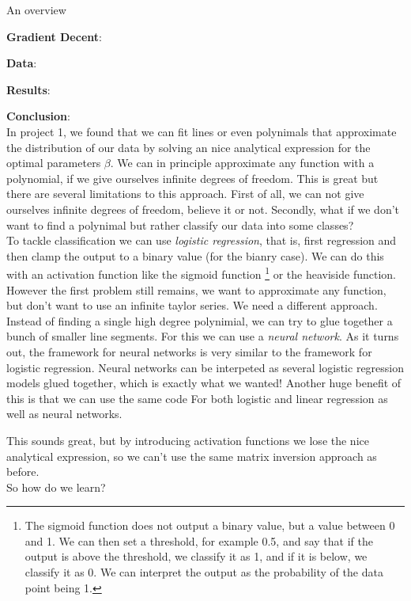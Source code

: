 \documentclass[twoside,11pt]{report}
\begin{document}
An overview

\textbf{Gradient Decent}: 

\textbf{Data}: 

\textbf{Results}:

\textbf{Conclusion}:\\

In project 1\cite{MachineLearningProjects_2023}, we found that 
we can fit lines or even polynimals that approximate the distribution of our data by solving an nice analytical expression for the optimal parameters $\beta$. We can in principle approximate 
any function with a polynomial, if we give ourselves infinite degrees of freedom. This is great but there are several
limitations to this approach. First of all, we can not give ourselves infinite degrees of freedom, believe it or not.
Secondly, what if we don't want to find a polynimal but rather classify our data into some classes?\\

To tackle classification we can use \emph{logistic regression}, that is, first regression and then clamp the output to a binary value
(for the bianry case). We can do this with an activation function like the sigmoid function
\footnote{The sigmoid function does not output a binary value, but a value between 0 and 1. 
    We can then set a threshold, for example 0.5, and say that if the output is above the threshold, 
    we classify it as 1, and if it is below, we classify it as 0. We can interpret the output as the probability of the data point being 1.}
or the heaviside function. However the first problem
still remains, we want to approximate any function, but don't want to use an infinite taylor series. 
We need a different approach.
Instead of finding a single high degree polynimial, we can try to glue together a bunch of smaller line segments.
For this we can use a \emph{neural network}.
As it turns out, the framework for neural networks is very similar to the framework for logistic regression.
Neural networks can be interpeted as several logistic regression models glued together, which is exactly what we wanted!
Another huge benefit of this is that we can use the same code
For both logistic and linear regression as well as neural networks.

This sounds great, but by introducing activation functions we lose the nice analytical expression,
so we can't use the same matrix inversion approach as before.\\
So how do we learn?
\end{document}
